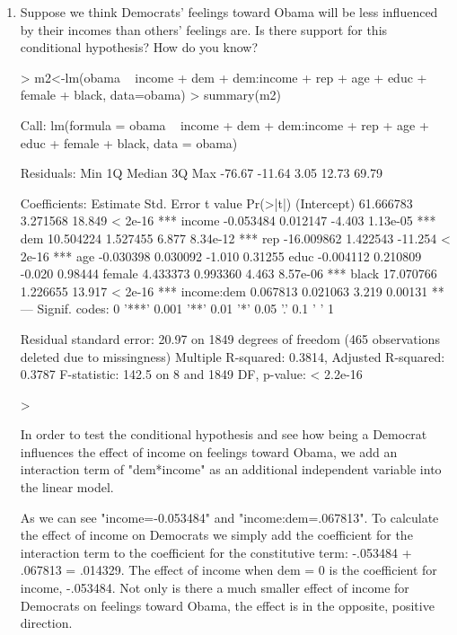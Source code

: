 \documentclass[12pt]{article}
\begin{document}
\begin{enumerate}
\item Suppose we think Democrats' feelings toward Obama will be less influenced by their incomes than others' feelings are.  Is there support for this conditional hypothesis?  How do you know?\\

\begin{Schunk}
\begin{Sinput}
> m2<-lm(obama ~ income + dem + dem:income + rep + age + educ + female + black, data=obama)
> summary(m2)
\end{Sinput}
\begin{Soutput}
Call:
lm(formula = obama ~ income + dem + dem:income + rep + age + 
    educ + female + black, data = obama)

Residuals:
   Min     1Q Median     3Q    Max 
-76.67 -11.64   3.05  12.73  69.79 

Coefficients:
              Estimate Std. Error t value Pr(>|t|)    
(Intercept)  61.666783   3.271568  18.849  < 2e-16 ***
income       -0.053484   0.012147  -4.403 1.13e-05 ***
dem          10.504224   1.527455   6.877 8.34e-12 ***
rep         -16.009862   1.422543 -11.254  < 2e-16 ***
age          -0.030398   0.030092  -1.010  0.31255    
educ         -0.004112   0.210809  -0.020  0.98444    
female        4.433373   0.993360   4.463 8.57e-06 ***
black        17.070766   1.226655  13.917  < 2e-16 ***
income:dem    0.067813   0.021063   3.219  0.00131 ** 
---
Signif. codes:  0 '***' 0.001 '**' 0.01 '*' 0.05 '.' 0.1 ' ' 1

Residual standard error: 20.97 on 1849 degrees of freedom
  (465 observations deleted due to missingness)
Multiple R-squared:  0.3814,	Adjusted R-squared:  0.3787 
F-statistic: 142.5 on 8 and 1849 DF,  p-value: < 2.2e-16
\end{Soutput}
\begin{Sinput}
> 
\end{Sinput}
\end{Schunk}
In order to test the conditional hypothesis and see how being a Democrat influences the effect of income on feelings toward Obama, we add an interaction term of "dem*income" as an additional independent variable into the linear model.  
  
As we can see "income=-0.053484" and "income:dem=.067813".  To calculate the effect of income on Democrats we simply add the coefficient for the interaction term to the coefficient for the constitutive term: -.053484 + .067813 = .014329.  The effect of income when dem = 0 is the coefficient for income, -.053484.  Not only is there a much smaller effect of income for Democrats on feelings toward Obama, the effect is in the opposite, positive direction.


\end{enumerate}
\end{document}

